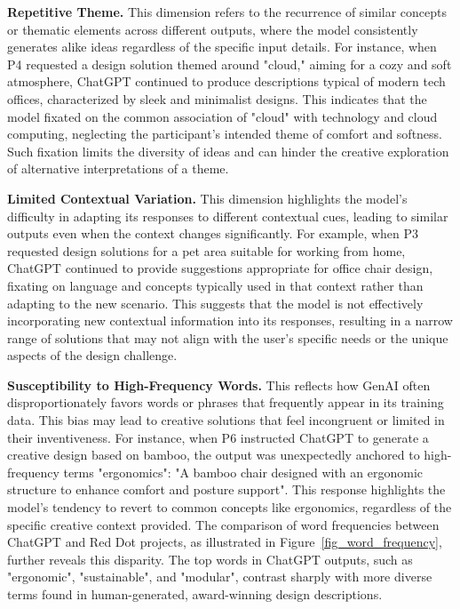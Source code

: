 \textbf{Repetitive Theme.} This dimension refers to the recurrence of similar concepts or thematic elements across different outputs, where the model consistently generates alike ideas regardless of the specific input details. For instance, when P4 requested a design solution themed around "cloud," aiming for a cozy and soft atmosphere, ChatGPT continued to produce descriptions typical of modern tech offices, characterized by sleek and minimalist designs. This indicates that the model fixated on the common association of "cloud" with technology and cloud computing, neglecting the participant's intended theme of comfort and softness. Such fixation limits the diversity of ideas and can hinder the creative exploration of alternative interpretations of a theme.

\textbf{Limited Contextual Variation.} This dimension highlights the model's difficulty in adapting its responses to different contextual cues, leading to similar outputs even when the context changes significantly. For example, when P3 requested design solutions for a pet area suitable for working from home, ChatGPT continued to provide suggestions appropriate for office chair design, fixating on language and concepts typically used in that context rather than adapting to the new scenario. This suggests that the model is not effectively incorporating new contextual information into its responses, resulting in a narrow range of solutions that may not align with the user's specific needs or the unique aspects of the design challenge.

\textbf{Susceptibility to High-Frequency Words.} This reflects how GenAI often disproportionately favors words or phrases that frequently appear in its training data. This bias may lead to creative solutions that feel incongruent or limited in their inventiveness. For instance, when P6 instructed ChatGPT to generate a creative design based on bamboo, the output was unexpectedly anchored to high-frequency terms "ergonomics": "A bamboo chair designed with an ergonomic structure to enhance comfort and posture support". This response highlights the model's tendency to revert to common concepts like ergonomics, regardless of the specific creative context provided. The comparison of word frequencies between ChatGPT and Red Dot projects, as illustrated in Figure~\ref{fig_word_frequency}, further reveals this disparity. The top words in ChatGPT outputs, such as "ergonomic", "sustainable", and "modular", contrast sharply with more diverse terms found in human-generated, award-winning design descriptions. 

